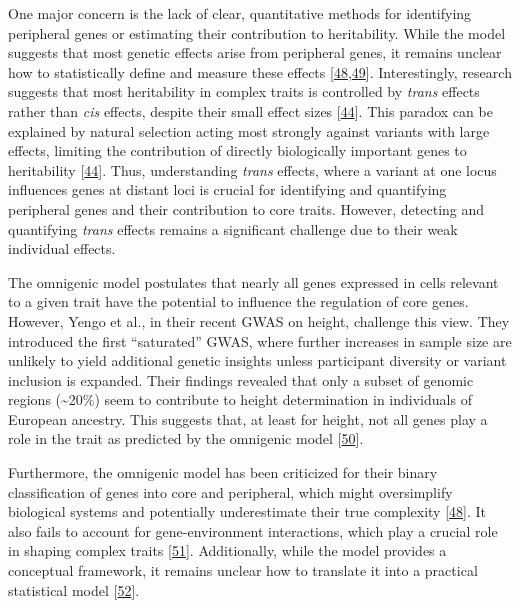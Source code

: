One major concern is the lack of clear, quantitative methods for identifying peripheral genes or estimating their contribution to heritability.
While the model suggests that most genetic effects arise from peripheral genes, it remains unclear how to statistically define and measure these effects {[}\protect\hyperlink{ref-82fs3SZo}{48},\protect\hyperlink{ref-javtAG7r}{49}{]}.
Interestingly, research suggests that most heritability in complex traits is controlled by \emph{trans} effects rather than \emph{cis} effects, despite their small effect sizes {[}\protect\hyperlink{ref-LXvTZzEA}{44}{]}.
This paradox can be explained by natural selection acting most strongly against variants with large effects, limiting the contribution of directly biologically important genes to heritability {[}\protect\hyperlink{ref-LXvTZzEA}{44}{]}.
Thus, understanding \emph{trans} effects, where a variant at one locus influences genes at distant loci is crucial for identifying and quantifying peripheral genes and their contribution to core traits.
However, detecting and quantifying \emph{trans} effects remains a significant challenge due to their weak individual effects.

The omnigenic model postulates that nearly all genes expressed in cells relevant to a given trait have the potential to influence the regulation of core genes.
However, Yengo et al., in their recent GWAS on height, challenge this view.
They introduced the first ``saturated'' GWAS, where further increases in sample size are unlikely to yield additional genetic insights unless participant diversity or variant inclusion is expanded.
Their findings revealed that only a subset of genomic regions (\textasciitilde20\%) seem to contribute to height determination in individuals of European ancestry.
This suggests that, at least for height, not all genes play a role in the trait as predicted by the omnigenic model {[}\protect\hyperlink{ref-HFRaLwGQ}{50}{]}.

Furthermore, the omnigenic model has been criticized for their binary classification of genes into core and peripheral, which might oversimplify biological systems and potentially underestimate their true complexity {[}\protect\hyperlink{ref-82fs3SZo}{48}{]}.
It also fails to account for gene-environment interactions, which play a crucial role in shaping complex traits {[}\protect\hyperlink{ref-dg9nKuy0}{51}{]}.
Additionally, while the model provides a conceptual framework, it remains unclear how to translate it into a practical statistical model {[}\protect\hyperlink{ref-1GlQtJ9Yz}{52}{]}.

